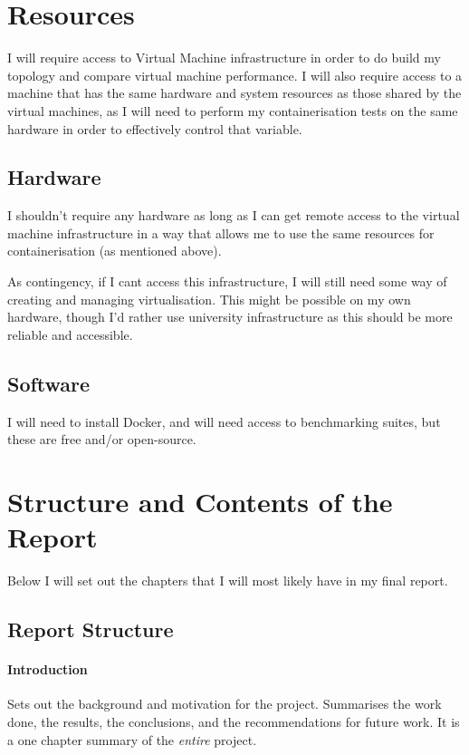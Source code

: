 \section{Resources}
I will require access to Virtual Machine infrastructure in order to do build my topology and compare virtual machine performance.
I will also require access to a machine that has the same hardware and system resources as those shared by the virtual machines, as I will need to perform my containerisation tests on the same hardware in order to effectively control that variable.

\subsection{Hardware}
I shouldn't require any hardware as long as I can get remote access to the virtual machine infrastructure in a way that allows me to use the same resources for containerisation (as mentioned above).

As contingency, if I cant access this infrastructure, I will still need some way of creating and managing virtualisation. This might be possible on my own hardware, though I'd rather use university infrastructure as this should be more reliable and accessible.

\subsection{Software}
I will need to install Docker, and will need access to benchmarking suites, but these are free and/or open-source.

\section{Structure and Contents of the Report}
Below I will set out the chapters that I will most likely have in my final report.
\subsection{Report Structure}

\paragraph{Introduction}  Sets out the background and motivation for the project.  Summarises the work done, the results, the conclusions, and the recommendations for future work.  It is a one chapter summary of the \emph{entire} project.

